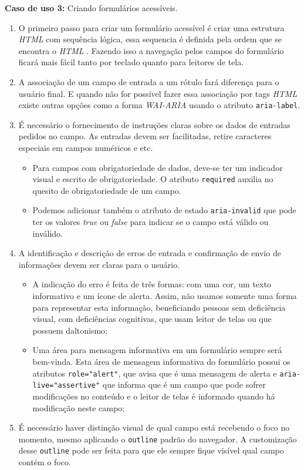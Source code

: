 {

\vspace{1.5cm}
{\centerline{\textbf{Caso de uso 3:} Criando formulários acessíveis.} }


\begin{enumerate}
    \item O primeiro passo para criar um formulário acessível é criar uma estrutura \textit{HTML} \cite{HTML} com sequência lógica, essa sequencia é definida pela ordem que se encontra o \textit{HTML} \cite{HTML}. Fazendo isso a navegação pelos campos do formulário ficará mais fácil tanto por teclado quanto para leitores de tela. 
    \item A associação de um campo de entrada a um rótulo fará diferença para o usuário final. E quando não for possível fazer essa associação por tags \textit{HTML} \cite{HTML} existe outras opções como a forma \textit{WAI-ARIA} \cite{WAI-ARIA} usando o atributo \lstinline{aria-label}.
    \item É necessário o fornecimento de instruções claras sobre os dados de entradas pedidos no campo. As entradas devem ser facilitadas, retire caracteres especiais em campos numéricos e etc. 
    \begin{itemize}
        \item Para campos com obrigatoriedade de dados, deve-se ter um indicador visual e escrito de obrigatoriedade. O atributo \lstinline{required} auxilia no quesito de obrigatoriedade de um campo.
        \item Podemos adicionar também o atributo de estado \lstinline{aria-invalid} que pode ter os valores \textit{true} ou \textit{false} para indicar se o campo está válido ou inválido.
    \end{itemize}
    \item A identificação e descrição de erros de entrada e confirmação de envio de informações devem ser claras para o usuário. 
    \begin{itemize}
        \item A indicação do erro é feita de três formas: com uma cor, um texto informativo e um ícone de alerta. Assim, não usamos somente uma forma para representar esta informação, beneficiando pessoas sem deficiência visual, com deficiências cognitivas, que usam leitor de telas ou que possuem daltonismo;
        \item Uma área para mensagem informativa em um formulário sempre será bem-vinda. Esta área de mensagem informativa do formulário possui os atributos \lstinline{role="alert"}, que avisa que é uma mensagem de alerta e \lstinline{aria-live="assertive"} que informa que é um campo que pode sofrer modificações no conteúdo e o leitor de telas é informado quando há modificação neste campo;
    \end{itemize}
    \item É necessário haver distinção visual de qual campo está recebendo o foco no momento, mesmo aplicando o \lstinline{outline} padrão do navegador. A customização desse \lstinline{outline} pode ser feita para que ele sempre fique visível qual campo contém o foco.
    

\end{enumerate}}
